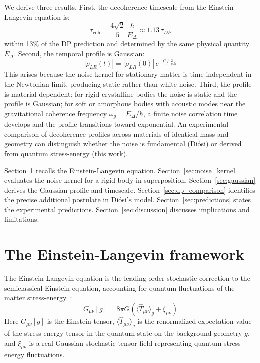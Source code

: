 \documentclass[12pt,a4paper]{article}
\begin{document}
We derive three results. First, the decoherence timescale from the Einstein-Langevin
equation is:
\begin{equation}
\tau_{\text{coh}} = \frac{4\sqrt{2}}{5}\,\frac{\hbar}{E_\Delta} \approx 1.13\,\tau_{DP}
\label{eq:tau_coh_preview}
\end{equation}
within 13\% of the DP prediction and determined by the same physical quantity $E_\Delta$.
Second, the temporal profile is Gaussian:
\begin{equation}
|\rho_{LR}(t)| = |\rho_{LR}(0)|\,e^{-t^2/\tau_{\text{coh}}^2}
\label{eq:gaussian_preview}
\end{equation}
This arises because the noise kernel for stationary matter is time-independent in the
Newtonian limit, producing static rather than white noise. Third, the profile is
material-dependent: for rigid crystalline bodies the noise is static and the profile is
Gaussian; for soft or amorphous bodies with acoustic modes near the gravitational coherence
frequency $\omega_g = E_\Delta/\hbar$, a finite noise correlation time develops and the
profile transitions toward exponential. An experimental comparison of decoherence profiles
across materials of identical mass and geometry can distinguish whether the noise is
fundamental (Di\'osi) or derived from quantum stress-energy (this work).

Section~\ref{sec:framework} recalls the Einstein-Langevin equation.
Section~\ref{sec:noise_kernel} evaluates the noise kernel for a rigid body in
superposition. Section~\ref{sec:gaussian} derives the Gaussian profile and timescale.
Section~\ref{sec:dp_comparison} identifies the precise additional postulate in Di\'osi's
model. Section~\ref{sec:predictions} states the experimental predictions.
Section~\ref{sec:discussion} discusses implications and limitations.

\section{The Einstein-Langevin framework}
\label{sec:framework}

The Einstein-Langevin equation is the leading-order stochastic correction to the
semiclassical Einstein equation, accounting for quantum fluctuations of the matter
stress-energy~\cite{hu_verdaguer}:
\begin{equation}
G_{\mu\nu}[g] = 8\pi G\!\left(\langle\hat{T}_{\mu\nu}\rangle_g + \xi_{\mu\nu}\right)
\label{eq:einstein_langevin}
\end{equation}
Here $G_{\mu\nu}[g]$ is the Einstein tensor, $\langle\hat{T}_{\mu\nu}\rangle_g$ is the
renormalized expectation value of the stress-energy tensor in the quantum state on the
background geometry $g$, and $\xi_{\mu\nu}$ is a real Gaussian stochastic tensor field
representing quantum stress-energy fluctuations.
\end{document}
